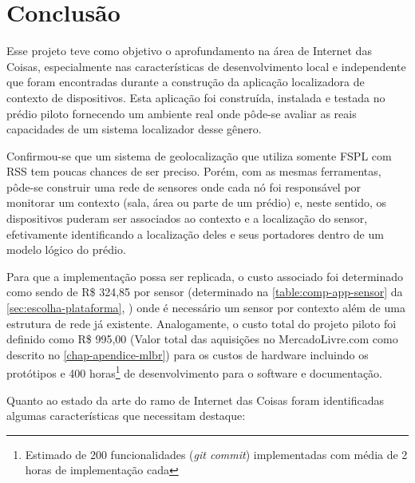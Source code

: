 \chapter{Conclusão}
\label{chap:Conclusao}


Esse projeto teve como objetivo o aprofundamento na área de Internet das Coisas,
especialmente nas características de desenvolvimento local e independente que
foram encontradas durante a construção da aplicação localizadora de contexto de
dispositivos. Esta aplicação foi construída, instalada e testada no prédio
piloto fornecendo um ambiente real onde pôde-se avaliar as reais capacidades de
um sistema localizador desse gênero.

Confirmou-se que um sistema de geolocalização que utiliza somente FSPL com RSS
tem poucas chances de ser preciso. Porém, com as mesmas ferramentas, pôde-se
construir uma rede de sensores onde cada nó foi responsável por monitorar um
contexto (sala, área ou parte de um prédio) e, neste sentido, os dispositivos
puderam ser associados ao contexto e a localização do sensor, efetivamente
identificando a localização deles e seus portadores dentro de um modelo lógico
do prédio.

Para que a implementação possa ser replicada, o custo associado foi determinado
como sendo de R\$ 324,85 por sensor (determinado na
\autoref{table:comp-app-sensor} da \autoref{sec:escolha-plataforma},
) onde é necessário um sensor por contexto
além de uma estrutura de rede já existente. Analogamente, o custo total do
projeto piloto foi definido como R\$ 995,00 (Valor total das aquisições no
MercadoLivre.com como descrito no \autoref{chap-apendice-mlbr}) para os custos
de hardware incluindo os protótipos e 400 horas\footnote{Estimado de 200
funcionalidades (\emph{git commit}) implementadas com média de 2 horas de
implementação cada} de desenvolvimento para o software e documentação.

Quanto ao estado da arte do ramo de Internet das Coisas foram identificadas
algumas características que necessitam destaque:


